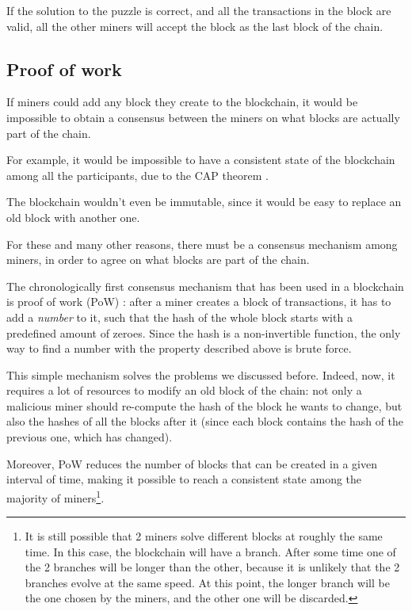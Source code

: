 \documentclass[12pt]{article}
\begin{document}
If the solution to the puzzle is correct, and all the transactions in the block are valid, all the other miners will accept the block as the last block of the chain.

\subsection{Proof of work} \label{subsection:pow}
If miners could add any block they create to the blockchain, it would be impossible to obtain a consensus between the miners on what blocks are actually part of the chain.

For example, it would be impossible to have a consistent state of the blockchain among all the participants, due to the CAP theorem \cite{CAP_theorem}.

The blockchain wouldn't even be immutable, since it would be easy to replace an old block with another one.

For these and many other reasons, there must be a consensus mechanism among miners, in order to agree on what blocks are part of the chain.

The chronologically first consensus mechanism that has been used in a blockchain is proof of work (PoW) \cite{bitcoin_seminal}: after a miner creates a block of transactions, it has to add a \textit{number} to it, such that the hash of the whole block starts with a predefined amount of zeroes.
Since the hash is a non-invertible function, the only way to find a number with the property described above is brute force.

This simple mechanism solves the problems we discussed before. Indeed, now, it requires a lot of resources to modify an old block of the chain: not only a malicious miner should re-compute the hash of the block he wants to change, but also the hashes of all the blocks after it (since each block contains the hash of the previous one, which has changed).

Moreover, PoW reduces the number of blocks that can be created in a given interval of time, making it possible to reach a consistent state among the majority of miners\footnote{It is still possible that 2 miners solve different blocks at roughly the same time. In this case, the blockchain will have a branch. After some time one of the 2 branches will be longer than the other, because it is unlikely that the 2 branches evolve at the same speed. At this point, the longer branch will be the one chosen by the miners, and the other one will be discarded.}.
\end{document}
